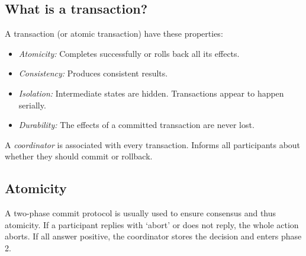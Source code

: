 \documentclass[a4paper, 12pt]{article}
\begin{document}
\subsection{What is a transaction?}
A transaction (or atomic transaction) have these properties:
\begin{itemize}
	\item \emph{Atomicity:} Completes successfully or rolls back all its effects.
	\item \emph{Consistency:} Produces consistent results.
	\item \emph{Isolation:} Intermediate states are hidden. Transactions appear to happen serially.
	\item \emph{Durability:} The effects of a committed transaction are never lost.
\end{itemize}
A \emph{coordinator} is associated with every transaction. Informs all participants about whether they should commit or rollback.

\subsection{Atomicity}
A two-phase commit protocol is usually used to ensure consensus and thus atomicity. If a participant replies with `abort' or does not reply, the whole action aborts. If all answer positive, the coordinator stores the decision and enters phase 2.
\end{document}

